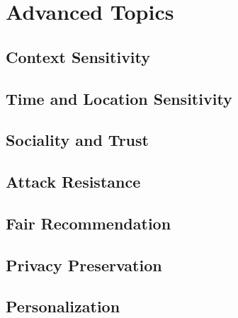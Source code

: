 %
%
%
\chapter{Advanced Topics}
\label{intro} %
\section{Context Sensitivity}
\section{Time and Location Sensitivity}
\section{Sociality and Trust}
\section{Attack Resistance}
\section{Fair Recommendation}
\section{Privacy Preservation}
\section{Personalization}


